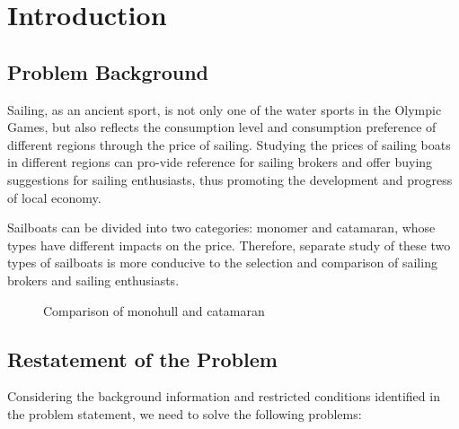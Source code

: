 \section{Introduction}

\subsection{Problem Background}
Sailing, as an ancient sport, is not only one of the water sports in the Olympic Games, but also reflects the consumption level and consumption preference of different regions through the price of sailing. Studying the prices of sailing boats in different regions can pro-vide reference for sailing brokers and offer buying suggestions for sailing enthusiasts, thus promoting the development and progress of local economy.

Sailboats can be divided into two categories: monomer and catamaran, whose types have different impacts on the price. Therefore, separate study of these two types of sailboats is more conducive to the selection and comparison of sailing brokers and sailing enthusiasts.
\begin{figure}[htbp]
    \centering    
	\caption{Comparison of monohull and catamaran} %
\end{figure}
\vspace{-1cm}
\subsection{Restatement of the Problem}
Considering the background information and restricted conditions identified in the problem statement, we need to solve the following problems:

